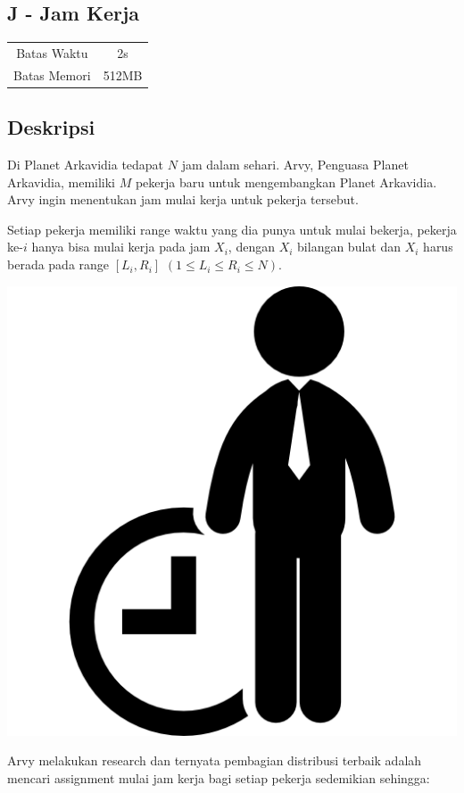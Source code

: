 \documentclass{article}
\begin{document}
\begin{center}
    \section*{J - Jam Kerja} %

    \begin{tabular}{ | c c | }
        \hline
        Batas Waktu  & 2s \\    %
        Batas Memori & 512MB \\  %
        \hline
    \end{tabular}
\end{center}

\subsection*{Deskripsi}
Di Planet Arkavidia tedapat $N$ jam dalam sehari. Arvy, Penguasa Planet Arkavidia, memiliki $M$ pekerja baru untuk mengembangkan Planet Arkavidia. Arvy ingin menentukan jam mulai kerja untuk pekerja tersebut.

Setiap pekerja memiliki range waktu yang dia punya untuk mulai bekerja, pekerja ke-$i$ hanya bisa mulai kerja pada jam $X_i$, dengan $X_i$ bilangan bulat dan $X_i$ harus berada pada range $\left[L_i, R_i\right]$ $(1 \leq L_i \leq R_i \leq N)$.
\begin{center}
\includegraphics[scale=0.7]{jamkerja.png}
\end{center}
Arvy melakukan research dan ternyata pembagian distribusi terbaik adalah mencari assignment mulai jam kerja bagi setiap pekerja sedemikian sehingga:
\end{document}
